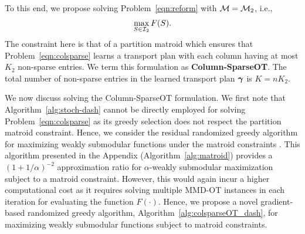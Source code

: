 To this end, we propose solving Problem~\ref{eqn:reform} with $\mathcal{M} = \mathcal{M}_2$, i.e., 
\begin{equation}\label{eqn:colsparse}
\max\limits_{S\in \mathcal{I}_2} F(S).
\end{equation}
The constraint here is that of a partition matroid which ensures that Problem~\ref{eqn:colsparse} learns a transport plan with each column having at most $K_2$ non-sparse entries. We term this formulation as \textbf{Column-SparseOT}. The total number of non-sparse entries in the learned transport plan $\bm{\gamma}$ is $K=nK_2$. 

We now discuss solving the Column-SparseOT formulation. We first note that Algorithm~\ref{alg:stoch-dash} cannot be directly employed for solving Problem~\ref{eqn:colsparse} as its greedy selection does not respect the partition matroid constraint. Hence, we consider the residual randomized greedy algorithm for maximizing weakly submodular functions under the matroid constraints \citep{pmlr-v80-chen18b}. This algorithm presented in the Appendix (Algorithm~\ref{alg:matroid}) provides a $(1+1/\alpha)^{-2}$ approximation ratio for $\alpha$-weakly submodular maximization subject to a matroid constraint. However, this would again incur a higher computational cost as it requires solving multiple MMD-OT instances in each iteration for evaluating the function $F(\cdot)$. Hence, we propose a novel gradient-based randomized greedy algorithm, Algorithm~\ref{alg:colsparseOT_dash}, for maximizing weakly submodular functions subject to matroid constraints.

